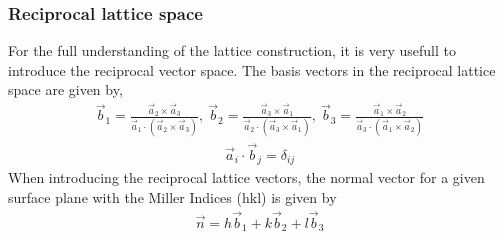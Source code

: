 \documentclass[11pt]{article} %
\begin{document}
\subsubsection{Reciprocal lattice space}
For the full understanding of the lattice construction, it is very usefull to introduce the reciprocal vector space. The basis vectors in the reciprocal lattice space are given by,
\begin{eqnarray}
\vec{b}_1 = \frac{\vec{a}_2 \times \vec{a}_3}{\vec{a}_1 \cdot (\vec{a}_2 \times \vec{a}_3)}, \ \vec{b}_2 = \frac{\vec{a}_3 \times \vec{a}_1}{\vec{a}_2 \cdot (\vec{a}_3 \times \vec{a}_1)}, \ \vec{b}_3 = \frac{\vec{a}_1 \times \vec{a}_2}{\vec{a}_3 \cdot (\vec{a}_1 \times \vec{a}_2)} 
\end{eqnarray}
\begin{eqnarray}
\vec{a}_i \cdot \vec{b}_j = \delta_{ij}  \label{orthogonality}
\end{eqnarray}
When introducing the reciprocal lattice vectors, the normal vector for a given surface plane with the Miller Indices (hkl) is given by 
\begin{eqnarray}
\vec{n} = h \vec{b}_1 + k \vec{b}_2 + l \vec{b}_3 \label{hklnormalvector}
\end{eqnarray}
\end{document}
